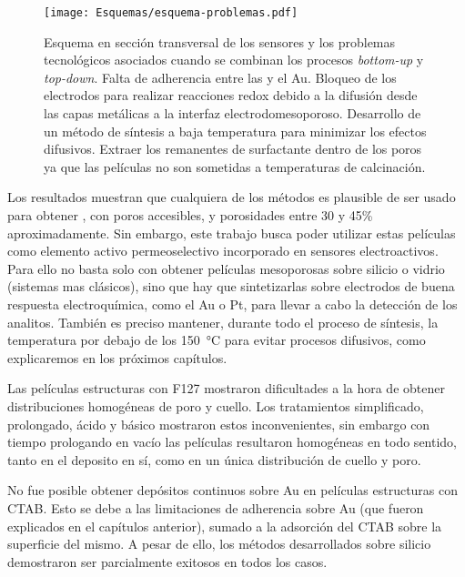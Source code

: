 {			\begin{figure}[!ht]
			\begin{center}
			\texttt{[image: Esquemas/esquema-problemas.pdf]}
			\caption[Modelo de los problemas tecnologicos]{Esquema en sección transversal de los sensores y los problemas tecnológicos asociados cuando se combinan los procesos\textit{ bottom-up} y\textit{ top-down}. \unorojo Falta de adherencia entre las \pdm\space y el Au. \dosvioleta Bloqueo de los electrodos para realizar reacciones redox debido a la difusión desde las capas metálicas a la interfaz electrodo\textbar mesoporoso. \tresamarillo Desarrollo de un método de síntesis a baja temperatura para minimizar los efectos difusivos. \cuatronaranja Extraer los remanentes de surfactante dentro de los poros ya que las películas no son sometidas a temperaturas de calcinación.}
			\label{fig:modelo-problemas}
			\end{center}
			\end{figure}
	

	Los resultados muestran que cualquiera de los métodos es plausible de ser usado para obtener \pdm, con poros accesibles, y porosidades entre 30 y 45\% aproximadamente. Sin embargo, este trabajo busca poder utilizar estas películas como elemento activo permeoselectivo incorporado en sensores electroactivos. Para ello no basta solo con obtener películas mesoporosas sobre silicio o vidrio (sistemas mas clásicos), sino que hay que sintetizarlas sobre electrodos de buena respuesta electroquímica, como el Au o Pt, para llevar a cabo la detección de los analitos. También es preciso mantener, durante todo el proceso de síntesis, la temperatura por debajo de los \SI{150}{\celsius} para evitar procesos difusivos, como explicaremos en los próximos capítulos.

	Las películas estructuras con F127 mostraron dificultades a la hora de obtener distribuciones homogéneas de poro y cuello. Los tratamientos simplificado, prolongado, ácido y básico mostraron estos inconvenientes, sin embargo con tiempo prologando en vacío las películas resultaron homogéneas en todo sentido, tanto en el deposito en sí, como en un única distribución de cuello y poro. 

	No fue posible obtener depósitos continuos sobre Au en películas estructuras con CTAB. Esto se debe a las limitaciones de adherencia sobre Au (que fueron explicados en el capítulos anterior), sumado a la adsorción del CTAB sobre la superficie del mismo. A pesar de ello, los métodos desarrollados sobre silicio demostraron ser parcialmente exitosos en todos los casos.

}
